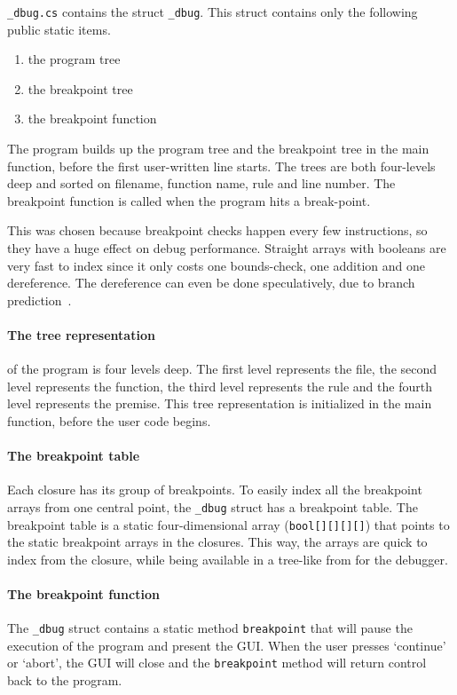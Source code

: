 \verb|_dbug.cs| contains the struct \verb|_dbug|.
This struct contains only the following public static items.

\begin{enumerate}
    \item the program tree
    \item the breakpoint tree
    \item the breakpoint function
\end{enumerate}

The program builds up the program tree and the breakpoint tree in the main function, before the first user-written line starts.
The trees are both four-levels deep and sorted on filename, function name, rule and line number.
The breakpoint function is called when the program hits a break-point.

This was chosen because breakpoint checks happen every few instructions, so they have a huge effect on debug performance.
Straight arrays with booleans are very fast to index since it only costs one bounds-check, one addition and one dereference.
The dereference can even be done speculatively, due to branch prediction~\cite{branchprediction}.

\paragraph{The tree representation} of the program is four levels deep.
The first level represents the file, the second level represents the function, the third level represents the rule and the fourth level represents the premise.
This tree representation is initialized in the main function, before the user code begins.

\paragraph{The breakpoint table} 
Each closure has its group of breakpoints.
To easily index all the breakpoint arrays from one central point, the \verb|_dbug| struct has a breakpoint table.
The breakpoint table is a static four-dimensional array (\verb|bool[][][][]|) that points to the static breakpoint arrays in the closures.
This way, the arrays are quick to index from the closure, while being available in a tree-like from for the debugger.

\paragraph{The breakpoint function}
The \verb|_dbug| struct contains a static method \verb|breakpoint| that will pause the execution of the program and present the GUI.
When the user presses `continue' or `abort', the GUI will close and the \verb|breakpoint| method will return control back to the program.

